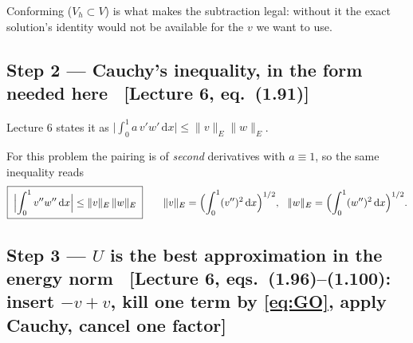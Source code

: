\documentclass[11pt]{article}
\newcommand{\dx}{\,\mathrm{d}x}
\newcommand{\norm}[1]{\lVert #1\rVert}
\newcommand{\src}[1]{{\small\color{black!55}\textsf{[#1]}}}
\begin{document}
\medskip
{\small\color{black!60}Conforming ($V_{h}\subset V$) is what makes the
subtraction legal: without it the exact solution's identity would not be
available for the $v$ we want to use.}

\subsection*{Step 2 --- Cauchy's inequality, in the form needed here
  \ \src{Lecture 6, eq.~(1.91)}}

\begin{steps}
\item Lecture 6 states it as
      $\bigl|\int_{0}^{1}a\,v'w'\dx\bigr|\le\norm{v}_{E}\norm{w}_{E}$.
\item For this problem the pairing is of \emph{second} derivatives with
      $a\equiv1$, so the same inequality reads
\begin{equation}\label{eq:cauchy}
  \boxed{\;\Bigl|\int_{0}^{1}v''w''\dx\Bigr|\le\norm{v}_{E}\,\norm{w}_{E}\;}
  \qquad
  \norm{v}_{E}=\Bigl(\int_{0}^{1}(v'')^{2}\dx\Bigr)^{1/2},\ \
  \norm{w}_{E}=\Bigl(\int_{0}^{1}(w'')^{2}\dx\Bigr)^{1/2}.
\end{equation}
\end{steps}

\subsection*{Step 3 --- $U$ is the best approximation in the energy norm
  \ \src{Lecture 6, eqs.~(1.96)--(1.100): insert $-v+v$, kill one term by
         \eqref{eq:GO}, apply Cauchy, cancel one factor}}
\end{document}
